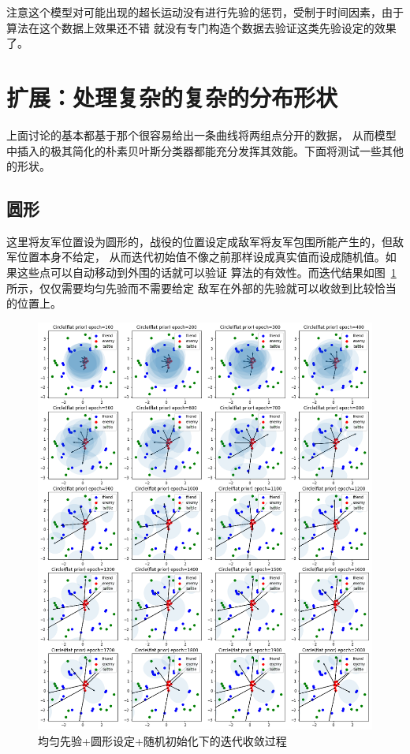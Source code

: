 \documentclass{article}
\begin{document}
注意这个模型对可能出现的超长运动没有进行先验的惩罚，受制于时间因素，由于算法在这个数据上效果还不错
就没有专门构造个数据去验证这类先验设定的效果了。

\section{扩展：处理复杂的复杂的分布形状}


上面讨论的基本都基于那个很容易给出一条曲线将两组点分开的数据，
从而模型中插入的极其简化的朴素贝叶斯分类器都能充分发挥其效能。下面将测试一些其他的形状。

\subsection{圆形}


这里将友军位置设为圆形的，战役的位置设定成敌军将友军包围所能产生的，但敌军位置本身不给定，
从而迭代初始值不像之前那样设成真实值而设成随机值。如果这些点可以自动移动到外围的话就可以验证
算法的有效性。而迭代结果如图~\ref{fig:circleIteration}所示，仅仅需要均匀先验而不需要给定
敌军在外部的先验就可以收敛到比较恰当的位置上。

\begin{figure}[ht]
\includegraphics[width=0.99\linewidth]{circle_iteration.png}
\caption{
均匀先验+圆形设定+随机初始化下的迭代收敛过程}
\label{fig:circleIteration}
\end{figure}
\end{document}

